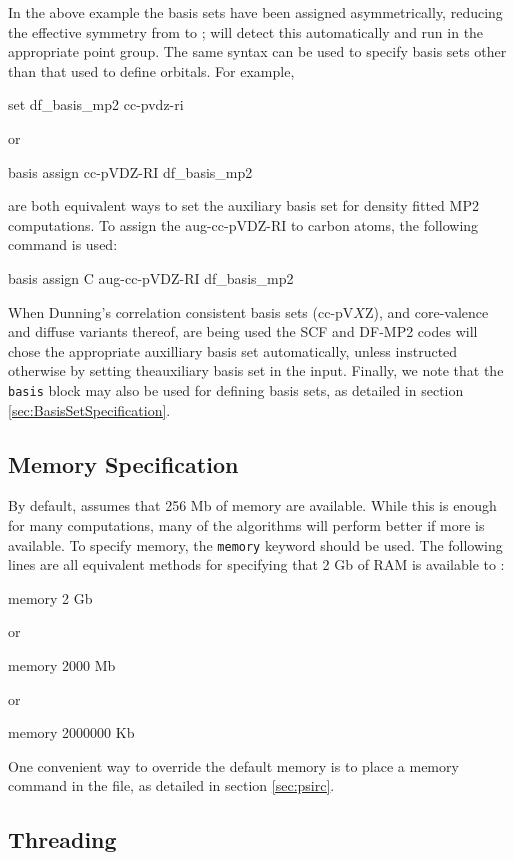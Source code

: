In the above example the basis sets have been assigned asymmetrically, reducing
the effective symmetry from  to ; \PSIfour will detect this
automatically and run in the appropriate point group.  The same syntax can be
used to specify basis sets other than that used to define orbitals.  For
example,

\begin{Snippet}
set df_basis_mp2 cc-pvdz-ri

 or

basis {
   assign cc-pVDZ-RI df_basis_mp2
}
\end{Snippet}
are both equivalent ways to set the auxiliary basis set for density fitted MP2
computations.  To assign the aug-cc-pVDZ-RI to carbon atoms, the following
command is used:
\begin{Snippet}
basis {
   assign C aug-cc-pVDZ-RI df_basis_mp2
}
\end{Snippet}

When Dunning's correlation consistent basis sets (cc-pV$X$Z), and core-valence
and diffuse variants thereof, are being used the SCF and DF-MP2 codes will
chose the appropriate auxilliary basis set automatically, unless instructed
otherwise by setting theauxiliary basis set in the input.  Finally, we note
that the {\tt basis} block may also be used for defining basis sets, as
detailed in section \ref{sec:BasisSetSpecification}.

\subsection{Memory Specification}
By default, \PSIfour assumes that 256 Mb of memory are available. While this is
enough for many computations, many of the algorithms will perform better if
more is available. To specify memory, the {\tt memory} keyword should be used. The following
lines are all equivalent methods for specifying that 2 Gb of RAM is available
to \PSIfour:
\begin{Snippet}
memory 2 Gb

 or

memory 2000 Mb

 or

memory 2000000 Kb
\end{Snippet}
One convenient way to override the \PSIfour default memory is to place a memory
command in the \psirc file, as detailed in section \ref{sec:psirc}.

\subsection{Threading}
\label{sec:threading}

